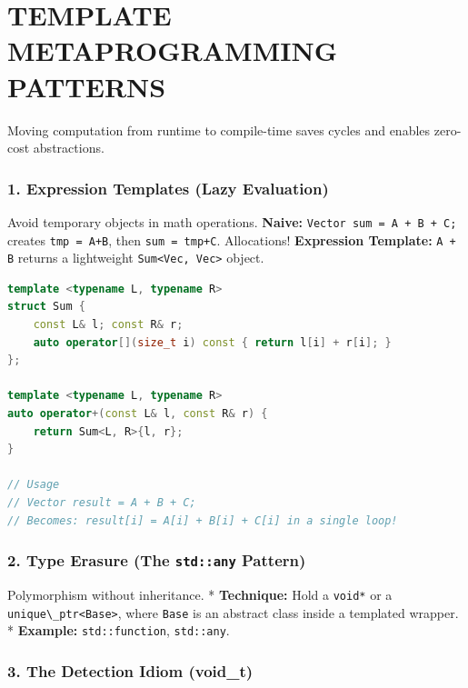 \hypertarget{template-metaprogramming-patterns}{%
\chapter{TEMPLATE METAPROGRAMMING
PATTERNS}\label{template-metaprogramming-patterns}}

Moving computation from runtime to compile-time saves cycles and enables
zero-cost abstractions.

\hypertarget{expression-templates-lazy-evaluation}{%
\subsection{1. Expression Templates (Lazy
Evaluation)}\label{expression-templates-lazy-evaluation}}

Avoid temporary objects in math operations. \textbf{Naive:}
\passthrough{\lstinline!Vector sum = A + B + C;!} creates
\passthrough{\lstinline!tmp = A+B!}, then
\passthrough{\lstinline!sum = tmp+C!}. Allocations! \textbf{Expression
Template:} \passthrough{\lstinline!A + B!} returns a lightweight
\passthrough{\lstinline!Sum<Vec, Vec>!} object.

\begin{lstlisting}[language={C++}]
template <typename L, typename R>
struct Sum {
    const L& l; const R& r;
    auto operator[](size_t i) const { return l[i] + r[i]; }
};

template <typename L, typename R>
auto operator+(const L& l, const R& r) {
    return Sum<L, R>{l, r};
}

// Usage
// Vector result = A + B + C; 
// Becomes: result[i] = A[i] + B[i] + C[i] in a single loop!
\end{lstlisting}

\hypertarget{type-erasure-the-stdany-pattern}{%
\subsection{\texorpdfstring{2. Type Erasure (The \texttt{std::any}
Pattern)}{2. Type Erasure (The std::any Pattern)}}\label{type-erasure-the-stdany-pattern}}

Polymorphism without inheritance. * \textbf{Technique:} Hold a
\passthrough{\lstinline!void*!} or a
\passthrough{\lstinline!unique\_ptr<Base>!}, where
\passthrough{\lstinline!Base!} is an abstract class inside a templated
wrapper. * \textbf{Example:} \passthrough{\lstinline!std::function!},
\passthrough{\lstinline!std::any!}.

\hypertarget{the-detection-idiom-void_t}{%
\subsection{3. The Detection Idiom
(void\_t)}\label{the-detection-idiom-void_t}}

